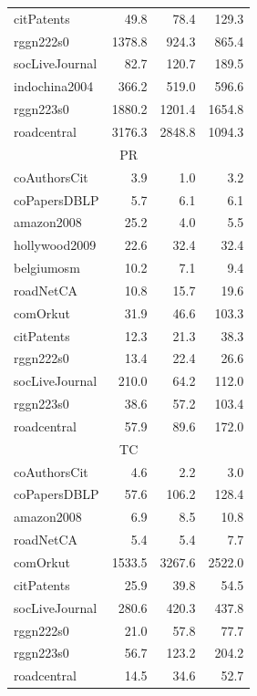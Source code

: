 \begin{table}[tbp]
\begin{center}
{\begin{tabular}{|l|r|r|r|}
        \rowcolor{black!2 } citPatents&49.8&78.4&129.3\\
        \rowcolor{black!10} rggn222s0&1378.8&924.3&865.4\\
        \rowcolor{black!2 } socLiveJournal&82.7&120.7&189.5\\
        \rowcolor{black!10} indochina2004&366.2&519.0&596.6\\
        \rowcolor{black!2 } rggn223s0&1880.2&1201.4&1654.8\\
        \rowcolor{black!10} roadcentral&3176.3&2848.8&1094.3\\
        \hline
        \hline
        \multicolumn{4}{|c|}{PR} \\
        \hline
        \rowcolor{black!10} coAuthorsCit&3.9&1.0&3.2\\
        \rowcolor{black!2 } coPapersDBLP&5.7&6.1&6.1\\
        \rowcolor{black!10} amazon2008&25.2&4.0&5.5\\
        \rowcolor{black!2 } hollywood2009&22.6&32.4&32.4\\
        \rowcolor{black!10} belgiumosm&10.2&7.1&9.4\\
        \rowcolor{black!2 } roadNetCA&10.8&15.7&19.6\\
        \rowcolor{black!10} comOrkut&31.9&46.6&103.3\\
        \rowcolor{black!2 } citPatents&12.3&21.3&38.3\\
        \rowcolor{black!10} rggn222s0&13.4&22.4&26.6\\
        \rowcolor{black!2 } socLiveJournal&210.0&64.2&112.0\\
        \rowcolor{black!10} rggn223s0&38.6&57.2&103.4\\
        \rowcolor{black!2 } roadcentral&57.9&89.6&172.0\\
        \hline
        \hline
        \multicolumn{4}{|c|}{TC} \\
        \hline
        \rowcolor{black!10} coAuthorsCit&4.6&2.2&3.0\\
        \rowcolor{black!2 } coPapersDBLP&57.6&106.2&128.4\\
        \rowcolor{black!10} amazon2008&6.9&8.5&10.8\\
        \rowcolor{black!2 } roadNetCA&5.4&5.4&7.7\\
        \rowcolor{black!10} comOrkut&1533.5&3267.6&2522.0\\
        \rowcolor{black!2 } citPatents&25.9&39.8&54.5\\
        \rowcolor{black!10} socLiveJournal&280.6&420.3&437.8\\
        \rowcolor{black!2 } rggn222s0&21.0&57.8&77.7\\
        \rowcolor{black!10} rggn223s0&56.7&123.2&204.2\\
        \rowcolor{black!2 } roadcentral&14.5&34.6&52.7\\
        \hline
        \end{tabular}
        }
        \label{rq2_table}
    \end{center}
    \end{table}
    
